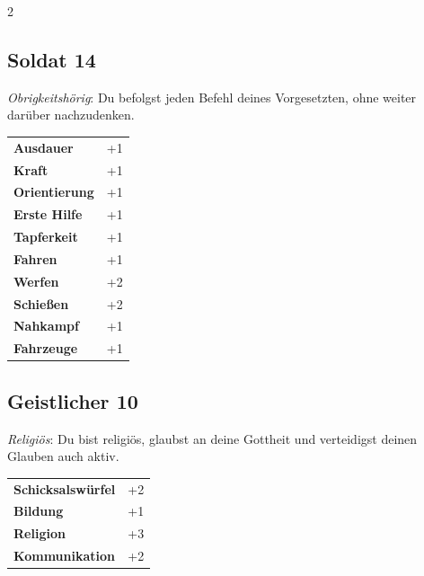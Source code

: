 \begin{multicols}{2}
\begin{tcolorbox}

\end{tcolorbox}

\begin{tcolorbox}
    \subsection*{Soldat \hfill \small{14 }}
    \tcblower
\textit{Obrigkeitshörig}: Du befolgst jeden Befehl deines Vorgesetzten, ohne weiter darüber nachzudenken.


\vspace{3mm}

\begin{tabular}{@{}ll@{}}
    \textbf{Ausdauer} & +1\\
    \textbf{Kraft} & +1\\
    \textbf{Orientierung} & +1\\
    \textbf{Erste Hilfe} & +1\\
    \textbf{Tapferkeit} & +1\\
    \textbf{Fahren} & +1\\
    \textbf{Werfen} & +2\\
    \textbf{Schießen} & +2\\
    \textbf{Nahkampf} & +1\\
    \textbf{Fahrzeuge} & +1\\
\end{tabular}


\end{tcolorbox}

\begin{tcolorbox}
    \subsection*{Geistlicher \hfill \small{10 }}
    \tcblower
\textit{Religiös}: Du bist religiös, glaubst an deine Gottheit und verteidigst deinen Glauben auch aktiv.


\vspace{3mm}

\begin{tabular}{@{}ll@{}}
    \textbf{Schicksalswürfel} & +2\\
    \textbf{Bildung} & +1\\
    \textbf{Religion} & +3\\
    \textbf{Kommunikation} & +2\\
\end{tabular}


\end{tcolorbox}
\end{multicols}
